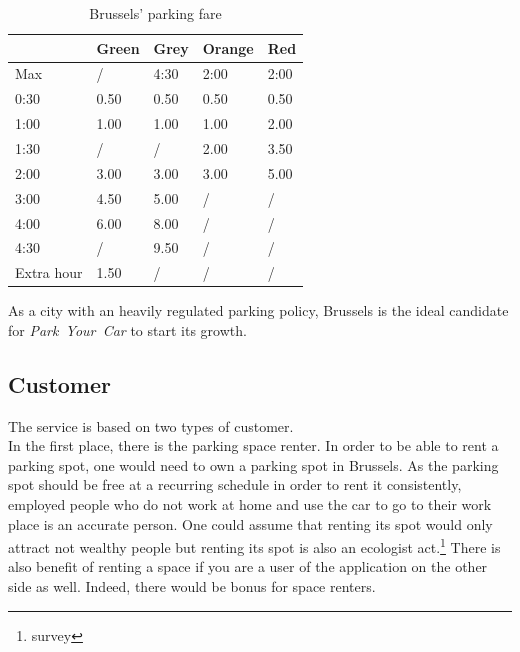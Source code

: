 \documentclass[12pt,a4paper,oneside]{book}
\newcommand{\bp}{\textit{Park~Your~Car }}
\begin{document}
\begin{table}[h]
\centering
\caption{Brussels' parking fare}
\label{bxfare}
\begin{tabular}{|l|l|l|l|l|}
\hline
           & Green & Grey & Orange & Red  \\ \hline
Max        & /     & 4:30 & 2:00   & 2:00 \\ \hline
0:30       & 0.50  & 0.50 & 0.50   & 0.50 \\ \hline
1:00       & 1.00  & 1.00 & 1.00   & 2.00 \\ \hline
1:30       & /     & /    & 2.00   & 3.50 \\ \hline
2:00       & 3.00  & 3.00 & 3.00   & 5.00 \\ \hline
3:00       & 4.50  & 5.00 & /      & /    \\ \hline
4:00       & 6.00  & 8.00 & /      & /    \\ \hline
4:30       & /     & 9.50 & /      & /    \\ \hline
Extra hour & 1.50  & /    & /      & /    \\ \hline
\end{tabular}
\end{table}

As a city with an heavily regulated parking policy, Brussels is the ideal candidate for \bp to start its growth.

\subsection{Customer}
The service is based on two types of customer.\\

In the first place, there is the parking space renter. In order to be able to rent a parking spot, one would need to own a parking spot in Brussels. As the parking spot should be free at a recurring schedule in order to rent it consistently, employed people who do not work at home and use the car to go to their work place is an accurate person. One could assume that renting its spot would only attract not wealthy people but renting its spot is also an ecologist act.\footnote{survey} There is also benefit of renting a space if you are a user of the application on the other side as well. Indeed, there would be bonus for space renters.\\
\end{document}

